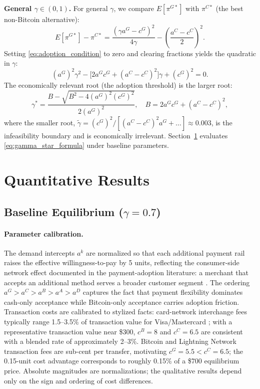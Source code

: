 \documentclass{article}
\begin{document}
\textbf{General $\gamma \in (0,1)$.}
For general $\gamma$, we compare $E[\pi^{G*}]$ with $\pi^{C*}$ (the best
non-Bitcoin alternative):
\begin{equation}
  E[\pi^{G*}] - \pi^{C*} =
    \frac{(\gamma a^G - c^G)^2}{4\gamma}
    - \left(\frac{a^C - c^C}{2}\right)^{\!2}.
  \label{eq:adoption_condition}
\end{equation}
Setting \eqref{eq:adoption_condition} to zero and clearing fractions yields the
quadratic in $\gamma$:
\begin{equation}
  (a^G)^2 \gamma^2
  - \bigl[2a^G c^G + (a^C - c^C)^2\bigr]\gamma
  + (c^G)^2 = 0.
  \label{eq:gamma_quadratic}
\end{equation}
The economically relevant root (the adoption threshold) is the larger root:
\begin{equation}
  \gamma^* = \frac{B - \sqrt{B^2 - 4(a^G)^2(c^G)^2}}{2(a^G)^2},
  \quad
  B = 2a^G c^G + (a^C - c^C)^2,
  \label{eq:gamma_star_formula}
\end{equation}
where the smaller root, $\tilde{\gamma} = (c^G)^2 / [(a^C-c^C)^2 a^G + \ldots]
\approx 0.003$, is the infeasibility boundary and is economically irrelevant.
Section~\ref{sec:results} evaluates \eqref{eq:gamma_star_formula} under baseline
parameters.

\section{Quantitative Results}
\label{sec:results}

\subsection{Baseline Equilibrium ($\gamma = 0.7$)}
\label{sec:baseline}

\paragraph{Parameter calibration.}
The demand intercepts $a^k$ are normalized so that each additional payment rail
raises the effective willingness-to-pay by 5 units, reflecting the consumer-side
network effect documented in the payment-adoption literature: a merchant that
accepts an additional method serves a broader customer segment
\citep{rysman2007}.
The ordering $a^G > a^C > a^B > a^A > a^D$ captures the fact that
payment flexibility dominates cash-only acceptance while Bitcoin-only acceptance
carries adoption friction.
Transaction costs are calibrated to stylized facts: card-network interchange fees
typically range 1.5--3.5\% of transaction value for Visa/Mastercard
\citep{rochet2003}; with a representative transaction value near \$300,
$c^B = 8$ and $c^C = 6.5$ are consistent with a blended rate of
approximately 2--3\%.
Bitcoin and Lightning Network transaction fees are sub-cent per transfer,
motivating $c^G = 5.5 < c^C = 6.5$; the 0.15-unit cost advantage corresponds
to roughly 0.15\% of a \$700 equilibrium price.
Absolute magnitudes are normalizations; the qualitative results depend only
on the sign and ordering of cost differences.
\end{document}
